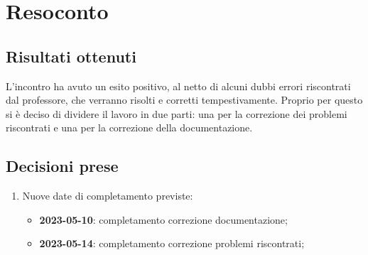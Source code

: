 \section{Resoconto}

\subsection{Risultati ottenuti}

L'incontro ha avuto un esito positivo, al netto di alcuni dubbi errori riscontrati dal professore, che verranno risolti e corretti tempestivamente. Proprio per questo si è deciso di dividere il lavoro in due parti: una per la correzione dei problemi riscontrati e una per la correzione della documentazione.

\subsection{Decisioni prese}

\begin{enumerate}

    \item Nuove date di completamento previste:
    \begin{itemize}
        \item \textbf{2023-05-10}: completamento correzione documentazione;
        \item \textbf{2023-05-14}: completamento correzione problemi riscontrati;
    \end{itemize}

\end{enumerate}
